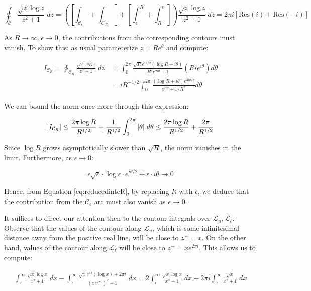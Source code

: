 \documentclass[12pt]{article}%
\newcommand{\C}{\mathcal{C}}
\newcommand{\Lcal}{\mathcal{L}}
\newcommand{\contint}[1][\mathcal{C}]{\oint_{#1}}
\begin{document}
\[ \contint \frac{\sqrt{z}\log{z}}{z^2 + 1} \; dz = \left(\left[ \int_{\C_\epsilon} + \int_{C_R}\right] + \left[\int_\epsilon^R + \int_R^\epsilon \right] \right) \frac{\sqrt{z}\log{z}}{z^2 + 1} \; dz = 2\pi i\left[\text{Res}(i) + \text{Res}(-i)\right] \]

As $R \rightarrow \infty, \epsilon \rightarrow 0$, the contributions from the corresponding contours must vanish. To show this: as usual parameterize $z = Re^{\theta}$ and compute:

\begin{align}
\label{eq:reducedinteR}  I_{\C_R} = \oint_{\C_R} \frac{\sqrt{z}\log{z}}{z^2 + 1} \; dz & = \int_0^{2\pi} \frac{\sqrt{R}e^{i\theta/2}(\log{R} + i\theta)}{R^2e^{2i\theta} + 1} (Rie^{i\theta}) d\theta \\
  & = iR^{-1/2}\int_0^{2\pi} \frac{(\log{R} + i\theta)e^{3i\theta/2}}{e^{2i\theta} + 1/R^2} d\theta
\end{align}

We can bound the norm once more through this expression:

\begin{align*}
  \abs{I_{\C_R}} \leq \frac{2\pi\log{R}}{R^{1/2}} + \frac{1}{R^{1/2}} \int_0^{2\pi} \abs{\theta} \; d\theta \leq \frac{2\pi\log{R}}{R^{1/2}} + \frac{2\pi}{R^{1/2}}
\end{align*}

Since $\log{R}$ grows asymptotically slower than $\sqrt{R}$, the norm vanishes in the limit. Furthermore, as $\epsilon \rightarrow 0$:

\[\epsilon\sqrt{\epsilon}\cdot \log{\epsilon} \cdot e^{i\theta/2}+ \epsilon \cdot i\theta  \rightarrow 0\]

Hence, from Equation \ref{eq:reducedinteR}, by replacing $R$ with $\epsilon$, we deduce that the contribution from the $\C_\epsilon$ arc must also vanish as $\epsilon \rightarrow 0$. \newline

It suffices to direct our attention then to the contour integrals over $\Lcal_u,\Lcal_\ell$. Observe that the values of the contour along $\Lcal_u$, which is some infinitesimal distance away from the positive real line, will be close to $z^+ = x$. On the other hand, values of the contour along $\Lcal_\ell$ will be close to $z^- = xe^{2\pi i}$. This allows us to compute:

\begin{align} \label{eq:landmark}
  \int_{\epsilon}^\infty \frac{\sqrt{x}\log{x}}{x^2 + 1} \; dx - \int_{\epsilon}^\infty \frac{\sqrt{x}e^{\pi i}(\log{x}) + 2\pi i}{(xe^{2\pi i})^2 + 1} \; dx = 2 \int_{\epsilon}^\infty \frac{\sqrt{x}\log{x}}{x^2 + 1} \; dx + 2 \pi i \int_\epsilon^\infty \frac{\sqrt{x}}{x^2 + 1} \; dx
\end{align} \newline
\end{document}
